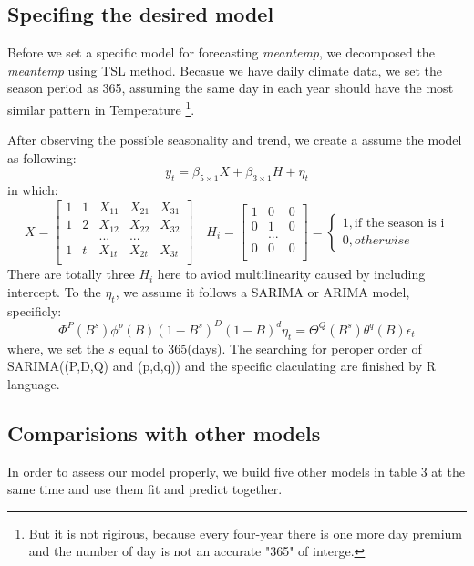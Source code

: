 \documentclass[12pt]{article}
\begin{document}
\subsection{Specifing the desired model}
Before we set a specific model for forecasting \textit{meantemp}, 
we decomposed the \textit{meantemp} using TSL method\cite{fpp3stl}. Becasue
we have daily climate data, we set the season period as 365, assuming 
the same day in each year should have the most similar pattern in Temperature
\footnote{But it is not rigirous, because every 
four-year there is one more day premium and the number of day
is not an accurate "365" of interge.}.

After observing the possible seasonality and trend, we create a assume the model as following:
\[
y_t = \beta_{5 \times 1} X + \beta_{3 \times 1} H + \eta_t
\]
in which:
\[
X = \begin{bmatrix}
    1 & 1 & X_{11} & X_{21} & X_{31}\\
    1 & 2 & X_{12} & X_{22} & X_{32}\\
    & & ... & ... &\\
    1 & t & X_{1t} & X_{2t} & X_{3t} \\
    \end{bmatrix}
\quad H_i = 
\begin{bmatrix}
    1 & 0 & 0\\
    0 & 1 & 0\\
     & ... & \\
    0 & 0 & 0 \\
    \end{bmatrix} =
\begin{cases}
    1, \text{if the season is i} \\
    0, other wise
\end{cases}
\]
There are totally three $H_i$ here to aviod multilinearity 
caused by including intercept. To the $\eta_t$, we assume it follows
a SARIMA or ARIMA model, specificly:
\[
\Phi^P(B^s) \phi^p(B) (1-B^s)^D (1-B)^d \eta_t = 
\Theta^Q(B^s) \theta^q(B) \epsilon_t
\]
where, we set the $s$ equal to 365(days). The searching for peroper order  
of SARIMA((P,D,Q) and (p,d,q)) and the specific claculating are finished
by R language.

\subsection{Comparisions with other models}
In order to assess our model properly, we build five other models 
in table 3 at the same time and use them fit and predict together.
\end{document}
